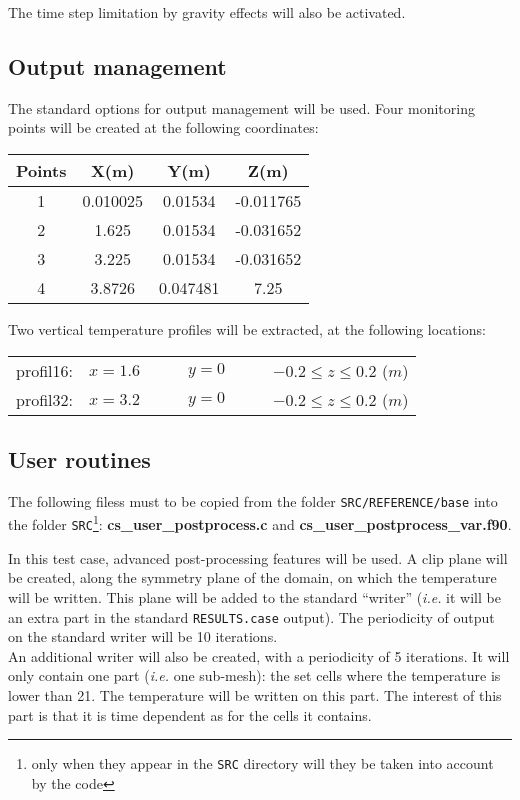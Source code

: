 The time step limitation by gravity effects will also be activated.


        \subsection{Output management}
The standard options for output management will be used. Four monitoring points
will be created at the following coordinates:

\begin{center}
\begin{tabular}{|c|c|c|c|}
\hline
Points & X(m) & Y(m) & Z(m)\\
\hline
1 & 0.010025 & 0.01534 & -0.011765 \\
\hline
2 & 1.625 & 0.01534 & -0.031652 \\
\hline
3 & 3.225 & 0.01534 & -0.031652 \\
\hline
4 & 3.8726 & 0.047481 & 7.25 \\
\hline
\end{tabular}
\end{center}


Two vertical temperature profiles will be extracted, at the following locations:\\
\begin{tabular}{llll}
profil16: & $x=1.6\qquad$ & $y=0\qquad$ & $-0.2 \leqslant z \leqslant 0.2$ ($m$)\\
profil32: & $x=3.2\qquad$ & $y=0\qquad$ & $-0.2 \leqslant z \leqslant 0.2$ ($m$)
\end{tabular}


        \subsection{User routines}

The following filess must to be copied from the folder \texttt{SRC/REFERENCE/base} into the
folder \texttt{SRC}\footnote{only when they appear in the \texttt{SRC} directory will they be
taken into account by the code}: {\bfseries cs\_user\_postprocess.c} and
{\bfseries cs\_user\_postprocess\_var.f90}.

In this test case, advanced post-processing features will be used. A clip
plane will be created, along the symmetry plane of the domain, on which the
temperature will be written. This plane will be added to the standard
``writer'' ({\em i.e.} it will be an extra part in the standard \texttt{RESULTS.case}
output). The periodicity of output on the standard writer will be 10 iterations.\\
An additional writer will also be created, with a periodicity of 5
iterations. It will only contain one part ({\em i.e.} one sub-mesh): the set
cells where the temperature is lower than 21\degresC. The temperature will be
written on this part. The interest of this part is that it is time dependent
as for the cells it contains.


